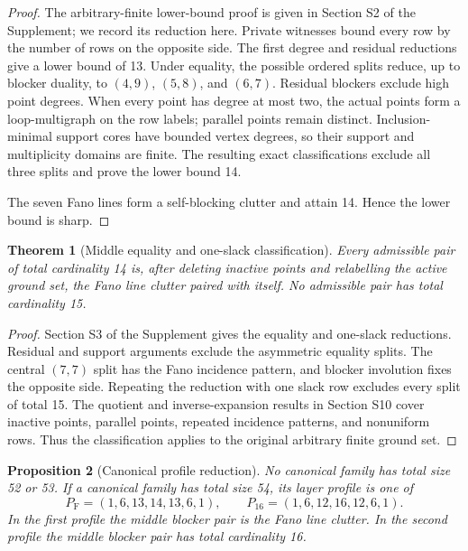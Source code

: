 \documentclass[a4paper,fleqn,longmktitle]{cas-sc}
\newtheorem{theorem}{Theorem}[section]
\newtheorem{proposition}[theorem]{Proposition}
\theoremstyle{definition}
\theoremstyle{remark}
\begin{document}
\begin{proof}
The arbitrary-finite lower-bound proof is given in Section S2 of the
Supplement; we record its reduction here.  Private witnesses bound every row
by the number of rows on the opposite side.  The first degree and residual
reductions give a lower bound of 13.  Under equality, the possible ordered
splits reduce, up to blocker duality, to $(4,9)$, $(5,8)$, and $(6,7)$.
Residual blockers exclude high point degrees.  When every point has degree at
most two, the actual points form a loop-multigraph on the row labels;
parallel points remain distinct.  Inclusion-minimal support cores have
bounded vertex degrees, so their support and multiplicity domains are finite.
The resulting exact classifications exclude all three splits and prove the
lower bound 14.

The seven Fano lines form a self-blocking clutter and attain 14.  Hence the
lower bound is sharp.
\end{proof}

\begin{theorem}[Middle equality and one-slack classification]
\label{thm:m33-classification-main}
Every admissible pair of total cardinality 14 is, after deleting inactive
points and relabelling the active ground set, the Fano line clutter paired
with itself.  No admissible pair has total cardinality 15.
\end{theorem}

\begin{proof}
Section S3 of the Supplement gives the equality and one-slack reductions.
Residual and support arguments exclude the asymmetric equality splits.  The
central $(7,7)$ split has the Fano incidence pattern, and blocker involution
fixes the opposite side.  Repeating the reduction with one slack row excludes
every split of total 15.  The quotient and inverse-expansion results in
Section S10 cover inactive points, parallel points, repeated incidence
patterns, and nonuniform rows.  Thus the classification applies to the
original arbitrary finite ground set.
\end{proof}

\begin{proposition}[Canonical profile reduction]
\label{prop:canonical-profiles}
No canonical family has total size 52 or 53.  If a canonical family has total
size 54, its layer profile is one of
\[
  P_{\mathrm F}=(1,6,13,14,13,6,1),\qquad
  P_{16}=(1,6,12,16,12,6,1).
\]
In the first profile the middle blocker pair is the Fano line clutter.  In the
second profile the middle blocker pair has total cardinality 16.
\end{proposition}
\end{document}
